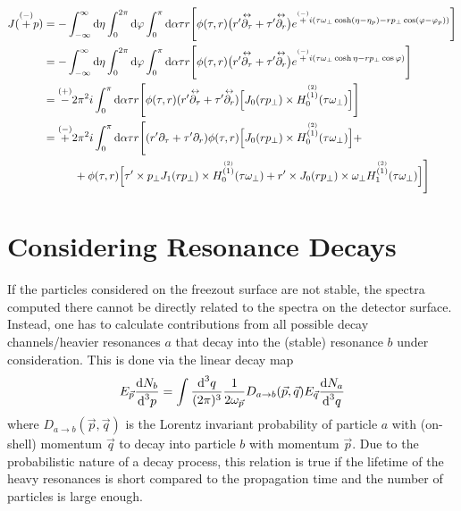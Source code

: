 \begin{subequations}
    \begin{align}
        J(\overset{(-)}{+}p) & =-\int_{-\infty}^\infty\text{d}\eta\int_0^{2\pi}\text{d}\varphi\int_0^\pi\text{d}\alpha\tau r\Bigg[\phi(\tau,r)\big(r^\prime\overset{\leftrightarrow}{\partial_\tau}+\tau^\prime\overset{\leftrightarrow}{\partial_r}\big)e^{\overset{(-)}{+}{i}(\tau \omega_\perp\cosh(\eta-\eta_p)-r p_\perp\cos(\varphi-\varphi_p))}\Bigg] \\
                           & =-\int_{-\infty}^\infty\text{d}\eta\int_0^{2\pi}\text{d}\varphi\int_0^\pi\text{d}\alpha\tau r\Bigg[\phi(\tau,r)\big(r^\prime\overset{\leftrightarrow}{\partial_\tau}+\tau^\prime\overset{\leftrightarrow}{\partial_r}\big)e^{\overset{(-)}{+}{i}(\tau \omega_\perp\cosh\eta-r p_\perp\cos\varphi)}\Bigg]                      \\
                           & =\overset{(+)}{-}2\pi^2{i}\int_0^\pi\text{d}\alpha\tau r\Bigg[\phi(\tau,r)(r^\prime\overset{\leftrightarrow}{\partial_\tau}+\tau^\prime\overset{\leftrightarrow}{\partial_r})\Big[J_0(r p_\perp)\times H_0^{\overset{(2)}{(1)}}(\tau\omega_\perp)\Big]\Bigg]                                                 \\
                           & =\overset{(-)}{+}2\pi^2{i}\int_0^\pi\text{d}\alpha\tau r\Bigg[(r^\prime\partial_\tau+\tau^\prime\partial_r)\phi(\tau,r)\Big[J_0(r p_\perp)\times H_0^{\overset{(2)}{(1)}}(\tau\omega_\perp)\Big]+\nonumber                                                                                             \\
                           & \phantom{=}\qquad + \phi(\tau,r)\Big[\tau^\prime\times p_\perp J_1(r p_\perp)\times H_0^{\overset{(2)}{(1)}}(\tau\omega_\perp)+r^\prime\times J_0(r p_\perp)\times\omega_\perp H_1^{\overset{(2)}{(1)}}(\tau\omega_\perp)\Big]\Bigg]
    \end{align}
\end{subequations}

\section{Considering Resonance Decays}

If the particles considered on the freezout surface are not stable, the spectra computed there cannot be directly related to the spectra on the detector surface. Instead, one has to calculate contributions from all possible decay channels/heavier resonances $a$ that decay into the (stable) resonance $b$ under consideration. This is done via the linear decay map
\begin{equation}
    E_{\vec{p}}\frac{\text{d} N_b}{\text{d}^3p}=\int\frac{\text{d}^3q}{(2\pi)^3}\frac{1}{2\omega_{\vec{p}}}D_{a\rightarrow b}(\vec{p},\vec{q})E_{\vec{q}}\frac{\text{d} N_a}{\text{d}^3 q}
\end{equation} 
where $D_{a\rightarrow b}(\vec{p},\vec{q})$ is the Lorentz invariant probability of particle $a$ with (on-shell) momentum $\vec{q}$ to decay into particle $b$ with momentum $\vec{p}$. Due to the probabilistic nature of a decay process, this relation is true if the lifetime of the heavy resonances is short compared to the propagation time and the number of particles is large enough.

